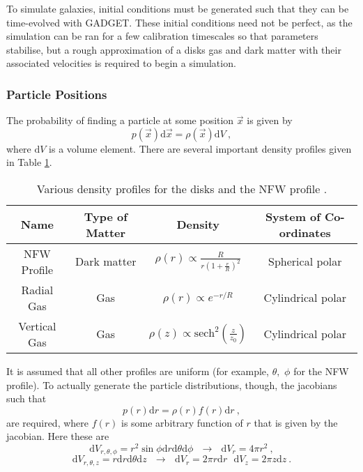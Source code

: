 To simulate galaxies, initial conditions must be generated such that they
can be time-evolved with GADGET. These initial conditions need not be
perfect, as the simulation can be ran for a few calibration timescales
so that parameters stabilise, but a rough approximation
of a disks gas and dark matter with their associated velocities is required to
begin a simulation.

\subsubsection{Particle Positions}

The probability of finding a particle at some position \(\vec{x}\) is
given by
\[
    p(\vec{x})\mathrm{d}\vec{x} = \rho(\vec{x})\mathrm{d}V~,
\]
where \(\mathrm{d}V\) is a volume element. There are several important
density profiles given in Table \ref{tab:profiles}.

\begin{table}
\centering
\begin{tabular}{c|c|c|c}
Name   &  Type of Matter  &    Density               & System of Co-ordinates \\ \hline
NFW Profile & Dark matter & $\rho(r) \propto \frac{R}{r\left(1 + \frac{r}{R}\right)^2}$ & Spherical polar \\
Radial Gas  & Gas & $\rho(r) \propto e^{-r/R}$ & Cylindrical polar \\
Vertical Gas & Gas & $\rho(z) \propto \mathrm{sech}^2\left(\frac{z}{z_0}\right)$ & Cylindrical polar \\
\end{tabular}
\caption{Various density profiles for the disks and the NFW profile \citep{ferriere_interstellar_2001, coe_dark_2010}.}
\label{tab:profiles}
\end{table}

It is assumed that all other profiles are uniform (for example,
\(\theta,\) \(\phi\) for the NFW profile). To actually generate the
particle distributions, though, the jacobians such that
\[
    p(r)\mathrm{d}r = \rho(r) f(r) \mathrm{d}r~,
\]
are required, where \(f(r)\) is some arbitrary function of \(r\) that is given by the
jacobian. Here these are
\[
    \mathrm{d}V_{r, \theta, \phi} = r^2\sin\phi\mathrm{d}r\mathrm{d}\theta\mathrm{d}\phi ~ ~ ~ \rightarrow ~ ~ ~ \mathrm{d}V_{r} = 4\pi r^2~,
\] \[
    \mathrm{d}V_{r, \theta, z} = r\mathrm{d}r\mathrm{d}\theta\mathrm{d}z ~ ~ ~ \rightarrow ~ ~ ~ \mathrm{d}V_{r} = 2\pi r \mathrm{d}r ~ ~ ~ \mathrm{d}V_z = 2\pi z \mathrm{d}z~.
\]

